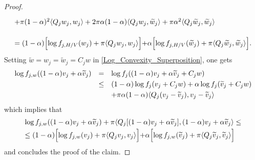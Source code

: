\documentclass[10pt,a4paper]{amsart}
\newcommand{\nm}{\noalign{\smallskip}}
\renewcommand{\tilde}{\widetilde}
\begin{document}
\begin{proof}
$$\begin{array}{lll}
    \nm 
    +\pi(1-\alpha)^2 \langle Q_jw_j,w_j \rangle+2\pi \alpha(1-\alpha) \langle Q_jw_j,\tilde w_j\rangle+\pi \alpha^2 \langle Q_j \tilde w_j, \tilde w_j \rangle \\ \\
    \nm 
    = (1-\alpha) \Bigl[ \log f_{j,H/V}(w_j)+\pi \langle Q_jw_j,w_j \rangle \Bigl]+ \alpha \Bigl[\log f_{j,H/V}(\tilde w_j)+\pi \langle Q_j\tilde w_j,\tilde w_j \rangle \Bigl].
    \end{array}$$ Setting $\tilde w=w_j=\tilde w_j=C_jw$ in \cref{Log_Convexity_Superposition}, one gets $$\begin{array}{lll}
    \log f_{j,w}((1-\alpha)v_j+\alpha \tilde v_j) &=& \log f_j((1-\alpha)v_j+\alpha \tilde v_j+C_jw) \\
    \nm 
    &\leq& (1-\alpha)\log f_j(v_j+C_jw)+\alpha \log f_j(\tilde v_j+C_jw) \\
    \nm 
    && +\pi \alpha (1-\alpha)\langle Q_j(v_j-\tilde v_j),v_j-\tilde v_j\rangle 
    \end{array}$$ which implies that $$\begin{array}{lll}
    \log f_{j,w}((1-\alpha)v_j+\alpha \tilde v_j)+\pi \langle Q_j[(1-\alpha )v_j+\alpha \tilde v_j],(1-\alpha)v_j+\alpha \tilde v_j\rangle \leq \\
    \nm 
    \leq (1-\alpha)\Bigl[\log f_{j,w}(v_j)+\pi \langle Q_jv_j,v_j \rangle \Bigl] +\alpha \Bigl[ \log f_{j,w}(\tilde v_j)+\pi \langle Q_j\tilde v_j,\tilde v_j\rangle \Bigl]
    \end{array}$$ and concludes the proof of the claim. 
\end{proof} 
\end{document}
